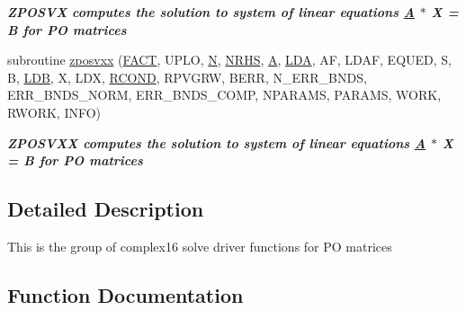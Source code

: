 \begin{DoxyCompactItemize}
\begin{DoxyCompactList}\small\item\em {\bfseries  Z\+P\+O\+S\+V\+X computes the solution to system of linear equations \hyperlink{classA}{A} $\ast$ X = B for P\+O matrices} \end{DoxyCompactList}\item 
subroutine \hyperlink{group__complex16POsolve_ga3536bbd664c6152bca5e47cffd0c6676}{zposvxx} (\hyperlink{superlu__enum__consts_8h_af00a42ecad444bbda75cde1b64bd7e72a1b6692b56d378abb85bd49063721d034}{F\+A\+C\+T}, U\+P\+L\+O, \hyperlink{polmisc_8c_a0240ac851181b84ac374872dc5434ee4}{N}, \hyperlink{example__user_8c_aa0138da002ce2a90360df2f521eb3198}{N\+R\+H\+S}, \hyperlink{classA}{A}, \hyperlink{example__user_8c_ae946da542ce0db94dced19b2ecefd1aa}{L\+D\+A}, A\+F, L\+D\+A\+F, E\+Q\+U\+E\+D, S, B, \hyperlink{example__user_8c_a50e90a7104df172b5a89a06c47fcca04}{L\+D\+B}, X, L\+D\+X, \hyperlink{superlu__enum__consts_8h_af00a42ecad444bbda75cde1b64bd7e72a9b5c151728d8512307565994c89919d5}{R\+C\+O\+N\+D}, R\+P\+V\+G\+R\+W, B\+E\+R\+R, N\+\_\+\+E\+R\+R\+\_\+\+B\+N\+D\+S, E\+R\+R\+\_\+\+B\+N\+D\+S\+\_\+\+N\+O\+R\+M, E\+R\+R\+\_\+\+B\+N\+D\+S\+\_\+\+C\+O\+M\+P, N\+P\+A\+R\+A\+M\+S, P\+A\+R\+A\+M\+S, W\+O\+R\+K, R\+W\+O\+R\+K, I\+N\+F\+O)
\begin{DoxyCompactList}\small\item\em {\bfseries  Z\+P\+O\+S\+V\+X\+X computes the solution to system of linear equations \hyperlink{classA}{A} $\ast$ X = B for P\+O matrices} \end{DoxyCompactList}\end{DoxyCompactItemize}


\subsection{Detailed Description}
This is the group of complex16 solve driver functions for P\+O matrices 

\subsection{Function Documentation}
\hypertarget{group__complex16POsolve_gae1f1548257a84b4328773c60eefb8934}{}
